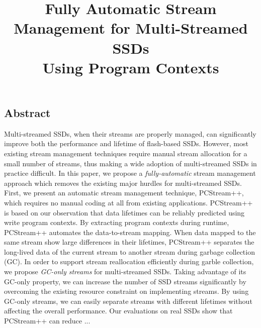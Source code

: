 \documentclass[letterpaper, twocolumn, 10pt]{article}
\begin{document}
\title{
\bf Fully Automatic Stream Management for Multi-Streamed SSDs \\ Using Program Contexts}

%


\maketitle
\pagestyle{empty}
\subsection*{Abstract}
Multi-streamed SSDs, when their streams are properly managed, 
can significantly improve both the performance and lifetime of flash-based SSDs.  
However, most existing stream management techniques
require manual stream allocation for a small number of streams, thus making 
a wide adoption of multi-streamed SSDs in practice difficult.  
In this paper, we propose a {\it fully-automatic} stream
management approach which removes the existing major hurdles for multi-streamed SSDs.  
First, we present  an automatic stream management technique, PCStream++, which requires 
no manual coding at all from existing applications.   
PCStream++ is based on our observation that data lifetimes can be reliably predicted
using write program contexts.
By extracting program contexts during runtime, PCStream++ automates the data-to-stream mapping.  
When data mapped to the same stream show large differences in their lifetimes,
PCStream++ separates the long-lived data of the current stream to 
another stream during garbage collection (GC).   
In order to support stream reallocation efficiently during garble collection, 
we propose {\it GC-only streams} for multi-streamed SSDs.   
Taking advantage of its GC-only property, we can increase the number of SSD streams 
significantly by overcoming the existing resource constraint on implementing streams.  
By using GC-only streams, we can easily separate streams with
different lifetimes without affecting the overall performance.    
Our evaluations on real SSDs show that PCStream++ can reduce ...









\end{document}
